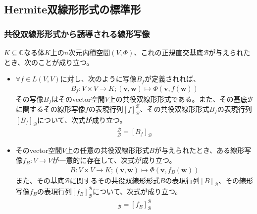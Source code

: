 \documentclass[dvipdfmx]{jsarticle}
\begin{document}
\subsection{Hermite双線形形式の標準形}%
\subsubsection{共役双線形形式から誘導される線形写像}%
\begin{thm}\label{2.3.10.1}
$K \subseteq \mathbb{C}$なる体$K$上の$n$次元内積空間$(V,\varPhi)$、これの正規直交基底$\mathcal{B}$が与えられたとき、次のことが成り立つ。
\begin{itemize}
\item
  $\forall f \in L(V,V)$に対し、次のように写像$B_{f}$が定義されれば、
\begin{align*}
B_{f}:V \times V \rightarrow K;\left( \mathbf{v},\mathbf{w} \right) \mapsto \varPhi\left( \mathbf{v},f\left( \mathbf{w} \right) \right)
\end{align*}
その写像$B_{f}$はそのvector空間$V$上の共役双線形形式である。また、その基底$\mathcal{B}$に関するその線形写像$f$の表現行列$[ f]_{\mathcal{B}}^{\mathcal{B}}$、その共役双線形形式$B_{f}$の表現行列$\left[ B_{f} \right]_{\mathcal{B}}$について、次式が成り立つ。
\begin{align*}
[ f]_{\mathcal{B}}^{\mathcal{B}} = \left[ B_{f} \right]_{\mathcal{B}}
\end{align*}
\item
  そのvector空間$V$上の任意の共役双線形形式$B$が与えられたとき、ある線形写像$f_{B}:V \rightarrow V$が一意的に存在して、次式が成り立つ。
\begin{align*}
B:V \times V \rightarrow K;\left( \mathbf{v},\mathbf{w} \right) \mapsto \varPhi\left( \mathbf{v},f_{B}\left( \mathbf{w} \right) \right)
\end{align*}
また、その基底$\mathcal{B}$に関するその共役双線形形式$B$の表現行列$[ B]_{\mathcal{B}}$、その線形写像$f_{B}$の表現行列$\left[ f_{B} \right]_{\mathcal{B}}^{\mathcal{B}}$について、次式が成り立つ。
\begin{align*}
[ B]_{\mathcal{B}} = \left[ f_{B} \right]_{\mathcal{B}}^{\mathcal{B}}
\end{align*}
\end{itemize}
\end{thm}
\end{document}
